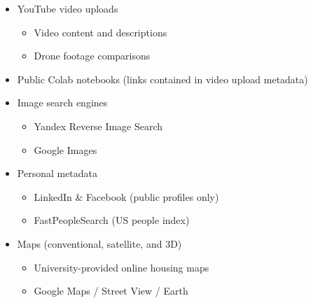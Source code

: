 \documentclass[a4paper,11pt]{report}
\begin{document}
\begin{itemize}
\item YouTube video uploads
\begin{itemize}
    \item Video content and descriptions
    \item Drone footage comparisons
\end{itemize}
\item Public Colab notebooks (links contained in video upload metadata)
\item Image search engines
\begin{itemize}
    \item Yandex Reverse Image Search
    \item Google Images
\end{itemize}
\item Personal metadata
\begin{itemize}
    \item LinkedIn \& Facebook (public profiles only)
    \item FastPeopleSearch (US people index)
\end{itemize}
\item Maps (conventional, satellite, and 3D)
\begin{itemize}
    \item University-provided online housing maps
    \item Google Maps / Street View / Earth
\end{itemize}
\end{itemize}
\end{document}
